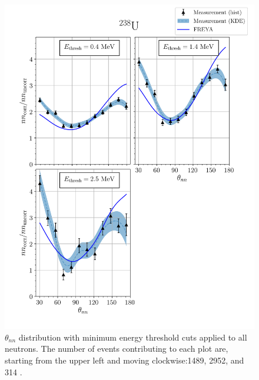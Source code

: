 \FloatBarrier
\begin{figure}
\centering
    \includegraphics[width = 1.1\textwidth]{Content/Results/FinalDUResultw_freya0KDE.png}
    \caption{$\theta_{nn}$ distribution with minimum energy threshold cuts applied to all neutrons.
    The number of events contributing to each plot are, starting from the upper left and moving clockwise:1489, 2952, and 314 .}
    \label{fig:DU(0)}
\end{figure}
